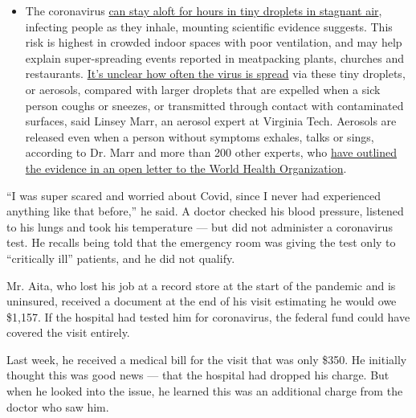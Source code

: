 \begin{itemize}
  \begin{itemize}
  \tightlist
  \item
    The coronavirus
    \href{https://www.nytimes.com/2020/07/04/health/239-experts-with-one-big-claim-the-coronavirus-is-airborne.html?action=click\&pgtype=Article\&state=default\&region=MAIN_CONTENT_3\&context=storylines_faq}{can
    stay aloft for hours in tiny droplets in stagnant air}, infecting
    people as they inhale, mounting scientific evidence suggests. This
    risk is highest in crowded indoor spaces with poor ventilation, and
    may help explain super-spreading events reported in meatpacking
    plants, churches and restaurants.
    \href{https://www.nytimes.com/2020/07/06/health/coronavirus-airborne-aerosols.html?action=click\&pgtype=Article\&state=default\&region=MAIN_CONTENT_3\&context=storylines_faq}{It's
    unclear how often the virus is spread} via these tiny droplets, or
    aerosols, compared with larger droplets that are expelled when a
    sick person coughs or sneezes, or transmitted through contact with
    contaminated surfaces, said Linsey Marr, an aerosol expert at
    Virginia Tech. Aerosols are released even when a person without
    symptoms exhales, talks or sings, according to Dr. Marr and more
    than 200 other experts, who
    \href{https://academic.oup.com/cid/article/doi/10.1093/cid/ciaa939/5867798}{have
    outlined the evidence in an open letter to the World Health
    Organization}.
  \end{itemize}
\end{itemize}

``I was super scared and worried about Covid, since I never had
experienced anything like that before,'' he said. A doctor checked his
blood pressure, listened to his lungs and took his temperature --- but
did not administer a coronavirus test. He recalls being told that the
emergency room was giving the test only to ``critically ill'' patients,
and he did not qualify.

Mr. Aita, who lost his job at a record store at the start of the
pandemic and is uninsured, received a document at the end of his visit
estimating he would owe \$1,157. If the hospital had tested him for
coronavirus, the federal fund could have covered the visit entirely.

Last week, he received a medical bill for the visit that was only \$350.
He initially thought this was good news --- that the hospital had
dropped his charge. But when he looked into the issue, he learned this
was an additional charge from the doctor who saw him.

